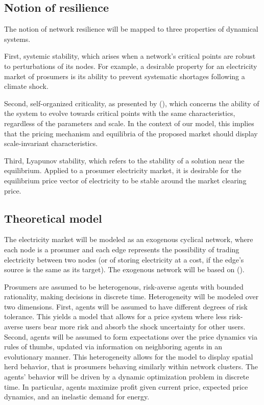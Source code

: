 \documentclass[american]{scrartcl}
\begin{document}
\subsection{Notion of resilience}

The notion of network resilience will be mapped to three properties of dynamical systems.

First, systemic stability, which arises when a network's critical points are robust to perturbations of its nodes. For example, a desirable property for an electricity market of prosumers is its ability to prevent systematic shortages following a climate shock.

Second, self-organized criticality, as presented by \citeauthor{Bak1995} (\citeyear{Bak1995}), which concerns the ability of the system to evolve towards critical points with the same characteristics, regardless of the parameters and scale. In the context of our model, this implies that the pricing mechanism and equilibria of the proposed market should display scale-invariant characteristics.

Third, Lyapunov stability, which refers to the stability of a solution near the equilibrium. Applied to a prosumer electricity market, it is desirable for the equilibrium price vector of electricity to be stable around the market clearing price.

\subsection{Theoretical model}

The electricity market will be modeled as an exogenous cyclical network, where each node is a prosumer and each edge represents the possibility of trading electricity between two nodes (or of storing electricity at a cost, if the edge's source is the same as its target). The exogenous network will be based on \citeauthor{Brown2019} (\citeyear{Brown2019}).

Prosumers are assumed to be heterogenous, risk-averse agents with bounded rationality, making decisions in discrete time. Heterogeneity will be modeled over two dimensions. First, agents will be assumed to have different degrees of risk tolerance. This yields a model that allows for a price system where less risk-averse users bear more risk and absorb the shock uncertainty for other users. Second, agents will be assumed to form expectations over the price dynamics via rules of thumbs, updated via information on neighboring agents in an evolutionary manner. This heterogeneity allows for the model to display spatial herd behavior, that is prosumers behaving similarly within network clusters. The agents' behavior will be driven by a dynamic optimization problem in discrete time. In particular, agents maximize profit given current price, expected price dynamics, and an inelastic demand for energy.
\end{document}

